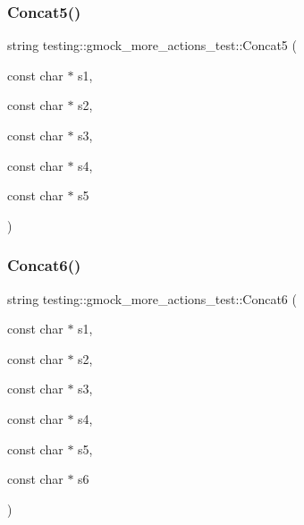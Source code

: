 \mbox{\label{namespacetesting_1_1gmock__more__actions__test_a2ac9917d1aa19cd7ac32bba837f4eacc}} 
\subsubsection{\texorpdfstring{Concat5()}{Concat5()}}
{\footnotesize\ttfamily string testing\+::gmock\+\_\+more\+\_\+actions\+\_\+test\+::\+Concat5 (\begin{DoxyParamCaption}\item[{const char $\ast$}]{s1,  }\item[{const char $\ast$}]{s2,  }\item[{const char $\ast$}]{s3,  }\item[{const char $\ast$}]{s4,  }\item[{const char $\ast$}]{s5 }\end{DoxyParamCaption})}

\mbox{\label{namespacetesting_1_1gmock__more__actions__test_a4de188277a85d007de0aa6e8dc364b75}} 
\subsubsection{\texorpdfstring{Concat6()}{Concat6()}}
{\footnotesize\ttfamily string testing\+::gmock\+\_\+more\+\_\+actions\+\_\+test\+::\+Concat6 (\begin{DoxyParamCaption}\item[{const char $\ast$}]{s1,  }\item[{const char $\ast$}]{s2,  }\item[{const char $\ast$}]{s3,  }\item[{const char $\ast$}]{s4,  }\item[{const char $\ast$}]{s5,  }\item[{const char $\ast$}]{s6 }\end{DoxyParamCaption})}

